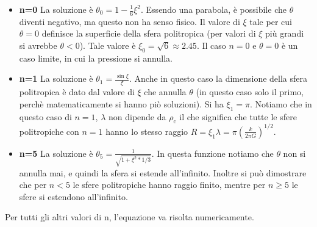 \begin{itemize}
\item \textbf{n=0} La soluzione è $\theta_0 = 1-\frac{1}{6}\xi^2$. Essendo una parabola, è possibile che $\theta$ diventi negativo, ma questo non ha senso fisico. Il valore di $\xi$ tale per cui $\theta=0$ definisce la superficie della sfera politropica (per valori di $\xi$ più grandi si avrebbe $\theta<0$). Tale valore è $\xi_0=\sqrt{6}\approx 2.45$. Il caso $n=0$ e $\theta=0$ è un caso limite, in cui la pressione si annulla.
\item \textbf{n=1} La soluzione è $\theta_1=\frac{\sin \xi}{\xi}$. Anche in questo caso la dimensione della sfera politropica è dato dal valore di $\xi$ che annulla $\theta$ (in questo caso solo il primo, perchè matematicamente si hanno piò soluzioni). Si ha $\xi_1=\pi$. Notiamo che in questo caso di $n=1$, $\lambda$ non dipende da $\rho_\mathrm{c}$ il che significa che tutte le sfere politropiche con $n=1$ hanno lo stesso raggio $R=\xi_1\lambda = \pi\left(\frac{k}{2\pi G} \right)^{1/2}$.
\item \textbf{n=5} La soluzione è $\theta_5 = \frac{1}{\sqrt{1+\xi^2*1/3}}$. In questa funzione notiamo che $\theta$ non si annulla mai, e quindi la sfera si estende all'infinito. Inoltre si può dimostrare che per $n<5$ le sfere politropiche hanno raggio finito, mentre per $n\geq 5$ le sfere si estendono all'infinito. 
\end{itemize}
Per tutti gli altri valori di n, l'equazione va risolta numericamente.

